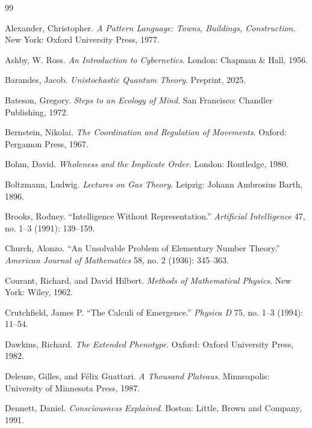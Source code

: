 \documentclass[12pt,openany]{book}
\theoremstyle{plain}
\theoremstyle{definition}
\theoremstyle{remark}
\begin{document}

\begin{thebibliography}{99}

Alexander, Christopher.
\textit{A Pattern Language: Towns, Buildings, Construction}.
New York: Oxford University Press, 1977.

Ashby, W. Ross.
\textit{An Introduction to Cybernetics}.
London: Chapman \& Hall, 1956.

Barandes, Jacob.
\textit{Unistochastic Quantum Theory}.
Preprint, 2025.

Bateson, Gregory.
\textit{Steps to an Ecology of Mind}.
San Francisco: Chandler Publishing, 1972.

Bernstein, Nikolai.
\textit{The Coordination and Regulation of Movements}.
Oxford: Pergamon Press, 1967.

Bohm, David.
\textit{Wholeness and the Implicate Order}.
London: Routledge, 1980.

Boltzmann, Ludwig.
\textit{Lectures on Gas Theory}.
Leipzig: Johann Ambrosius Barth, 1896.

Brooks, Rodney.
``Intelligence Without Representation.''
\textit{Artificial Intelligence} 47, no. 1--3 (1991): 139--159.

Church, Alonzo.
``An Unsolvable Problem of Elementary Number Theory.''
\textit{American Journal of Mathematics} 58, no. 2 (1936): 345--363.

Courant, Richard, and David Hilbert.
\textit{Methods of Mathematical Physics}.
New York: Wiley, 1962.

Crutchfield, James P.
``The Calculi of Emergence.''
\textit{Physica D} 75, no. 1--3 (1994): 11--54.

Dawkins, Richard.
\textit{The Extended Phenotype}.
Oxford: Oxford University Press, 1982.

Deleuze, Gilles, and Félix Guattari.
\textit{A Thousand Plateaus}.
Minneapolis: University of Minnesota Press, 1987.

Dennett, Daniel.
\textit{Consciousness Explained}.
Boston: Little, Brown and Company, 1991.


\end{thebibliography}
\end{document}
